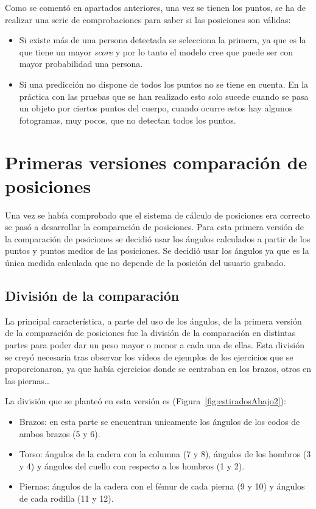 {Como se comentó en apartados anteriores, una vez se tienen los puntos, se ha de realizar una serie de comprobaciones para saber si las posiciones son válidas:
\begin{itemize}
	\item Si existe más de una persona detectada se selecciona la primera, ya que es la que tiene un mayor \textit{score} y por lo tanto el modelo cree que puede ser con mayor probabilidad una persona.
	\item Si una predicción no dispone de todos los puntos no se tiene en cuenta. En la práctica con las pruebas que se han realizado esto solo sucede cuando se pasa un objeto por ciertos puntos del cuerpo, cuando ocurre estos hay algunos fotogramas, muy pocos, que no detectan todos los puntos.
\end{itemize}

\section{Primeras versiones comparación de posiciones} \label{PrimeraVersion}
Una vez se había comprobado que el sistema de cálculo de posiciones era correcto se pasó a desarrollar la comparación de posiciones. Para esta primera versión de la comparación de posiciones se decidió usar los ángulos calculados a partir de los puntos y puntos medios de las posiciones. Se decidió usar los ángulos ya que es la única medida calculada que no depende de la posición del usuario grabado.
\subsection{División de la comparación}
La principal característica, a parte del uso de los ángulos, de la primera versión de la comparación de posiciones fue la división de la comparación en distintas partes para poder dar un peso mayor o menor a cada una de ellas. Esta división se creyó necesaria tras observar los vídeos de ejemplos de los ejercicios que se proporcionaron, ya que había ejercicios donde se centraban en los brazos, otros en las piernas\ldots

La división que se planteó en esta versión es (Figura~\ref{fig:estiradosAbajo2}):
\begin{itemize}
	\item Brazos: en esta parte se encuentran unicamente los ángulos de los codos de ambos brazos (5 y 6).
	\item Torso: ángulos de la cadera con la columna (7 y 8), ángulos de los hombros (3 y 4) y ángulos del cuello con respecto a los hombros (1 y 2).
	\item Piernas: ángulos de la cadera con el fémur de cada pierna (9 y 10) y ángulos de cada rodilla (11 y 12).
\end{itemize}

}
